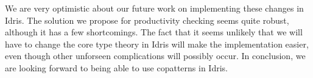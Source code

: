 We are very optimistic about our future work on implementing these changes in Idris. The solution we propose for productivity checking seems quite robust, although it has a few shortcomings. The fact that it seems unlikely that we will have to change the core type theory in Idris will make the implementation easier, even though other unforseen complications will possibly occur. In conclusion, we are looking forward to being able to use copatterns in Idris.

